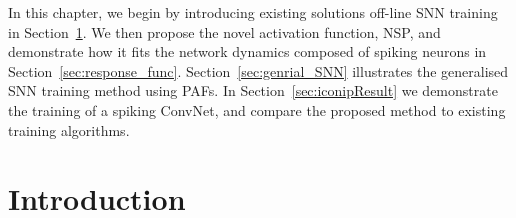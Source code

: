 \DIFaddend In this chapter, we begin by introducing existing solutions \DIFdelbegin {}\DIFdelend \DIFaddbegin {}\DIFaddend off-line SNN training in Section~\ref{sec:intro_NSP}.
We then propose the novel activation function, NSP, and demonstrate how it fits the network dynamics composed of spiking neurons in Section~\ref{sec:response_func}.
Section~\ref{sec:genrial_SNN} illustrates the generalised SNN training method using PAFs.
In Section~\ref{sec:iconipResult} we demonstrate the training of a spiking ConvNet, and compare the proposed method to existing training algorithms.

\section{Introduction}
\label{sec:intro_NSP}

